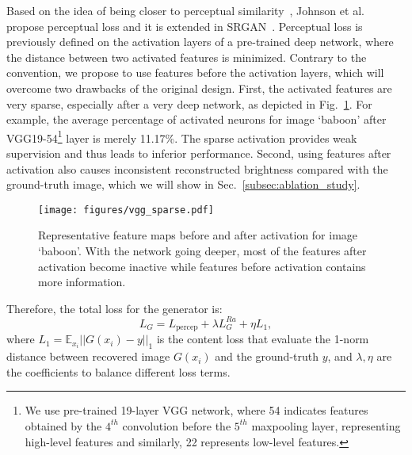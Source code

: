 \documentclass[runningheads]{llncs}
\begin{document}
Based on the idea of being closer to perceptual similarity~\cite{gatys2015texture,bruna2015super}, Johnson et  
al.~\cite{johnson2016perceptual} propose perceptual loss and it is extended in SRGAN~\cite{ledig2017photo}.
%
Perceptual loss is previously defined on the activation layers of a pre-trained deep network, where the distance  
between two activated features is minimized. Contrary to the convention, we propose to use features before the 
activation layers, which will overcome two drawbacks of the original design.
%
First, the activated features are very sparse, especially after a very deep network, as depicted in 
Fig.~\ref{fig:vgg_sparse}.
%
For example, the average percentage of activated neurons for image `baboon' after VGG19-54\footnote{We use pre-trained 
	19-layer VGG network\cite{simonyan2014very}, where 54 indicates features obtained by the $4^{th}$ convolution 
	before 
	the $5^{th}$ maxpooling layer, representing high-level features and similarly, 22 represents low-level features.} 
	layer 
is merely 11.17\%.
%
The sparse activation provides weak supervision and thus leads to inferior performance.
%
Second, using features after activation also causes inconsistent reconstructed brightness compared with the 
ground-truth image, which we will show in Sec.~\ref{subsec:ablation_study}.


\begin{figure}[htbp]
	\vspace{-0.2cm}
	\begin{center}
		\texttt{[image: figures/vgg\_sparse.pdf]}
	\end{center}
	\vspace{-0.5cm}
	\caption{Representative feature maps before and after activation for image `baboon'. With the network going deeper, 
		most of the features after activation become inactive while features before activation contains more 
		information.}
	\label{fig:vgg_sparse}
	\vspace{-0.5cm}
\end{figure}

Therefore, the total loss for the generator is:
%
\begin{equation}\label{equ:loss_function}
L_G = L_{\text{percep}} + \lambda{L_G^{Ra}}+ \eta{L_1},
\end{equation}
%
where $L_1 = \mathbb{E}_{x_i}||G(x_i) - y||_1$ is the content loss that evaluate the 1-norm distance between recovered 
image $G(x_i)$ and the ground-truth $y$, and $\lambda, \eta$ are the coefficients to balance different loss terms.
\end{document}
